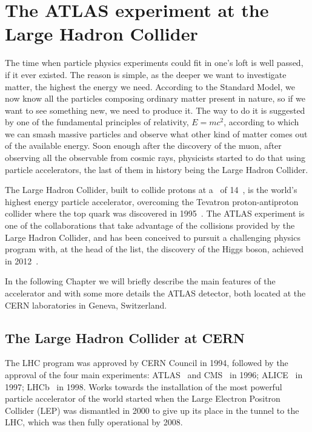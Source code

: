 \clearpage{\pagestyle{empty}\cleardoublepage}

\chapter{The ATLAS experiment at the Large Hadron Collider}\label{chap:atlas}

The time when particle physics experiments could fit in one's
loft is well passed, if it ever existed. The reason is simple,
as the deeper we want to investigate matter, the highest the energy
we need. According to the Standard Model, we now know all the
particles composing ordinary matter present in nature, so if we
want to see something new, we need to produce it. The way to
do it is suggested by one of the fundamental principles of relativity,
$E=mc^2$, according to which we can smash massive particles
and observe what other kind of matter comes out of the
available energy.
Soon enough after the discovery of the muon, after observing all
the observable from cosmic rays, physicists
started to do that using particle accelerators, the last of
them in history being the Large Hadron Collider.

The Large Hadron Collider, built to collide protons at a \cme\ of 14~\tev, 
is the world's highest energy particle accelerator, overcoming the Tevatron
proton-antiproton collider where the top quark was discovered
in 1995~\cite{PhysRevLett.74.2422,PhysRevLett.74.2626}.
The ATLAS experiment is one of the collaborations that take advantage
of the collisions provided by the Large Hadron Collider,
and has been conceived to pursuit a challenging physics program with,
at the head of the list, the discovery of the Higgs boson, achieved
in 2012~\cite{2012gk}.

In the following Chapter we will briefly describe the main features of 
the accelerator and with some more details the ATLAS detector, 
both located at the CERN laboratories in Geneva,
Switzerland.


\section{The Large Hadron Collider at CERN}\label{sec:lhc}

The LHC program was approved by CERN Council in 1994, followed by the approval of
the four main experiments: ATLAS~\cite{Aad:2008zzm} and CMS~\cite{cms}
in 1996; ALICE~\cite{alice} in 1997; LHCb~\cite{lhcb} in 1998.
Works towards the installation of the most powerful particle accelerator of the world
started when the Large Electron Positron Collider (LEP) was dismantled in 2000 to 
give up its place in the tunnel to the LHC, which was then fully operational by 2008.

